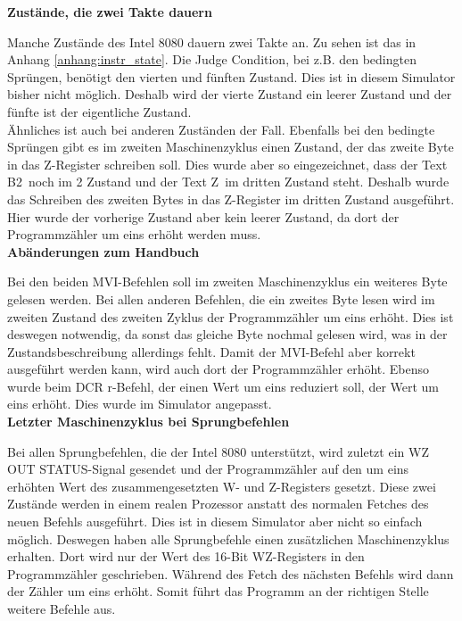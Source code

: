 \documentclass[12pt]{article}
\begin{document}
\noindent
\textbf{Zustände, die zwei Takte dauern}

\noindent
Manche Zustände des Intel 8080 dauern zwei Takte an. Zu sehen ist das in Anhang \ref{anhang:instr_state}. Die Judge Condition, bei z.B. den bedingten Sprüngen, benötigt den vierten und fünften Zustand. Dies ist in diesem Simulator bisher nicht möglich. Deshalb 
wird der vierte Zustand ein leerer Zustand und der fünfte ist der eigentliche Zustand. 
\\

\noindent
Ähnliches ist auch bei anderen Zuständen der Fall. Ebenfalls bei den bedingte Sprüngen gibt es im zweiten Maschinenzyklus einen Zustand, der das zweite Byte in das Z-Register schreiben soll. Dies wurde aber so eingezeichnet, dass der Text \glqq B2\grqq\ noch im 2 Zustand und der Text \glqq Z\grqq\ im dritten Zustand steht. Deshalb wurde das Schreiben des zweiten Bytes in das Z-Register im dritten Zustand ausgeführt. Hier wurde der vorherige Zustand aber kein leerer Zustand, da dort der Programmzähler um eins erhöht werden muss.
\\

\noindent
\textbf{Abänderungen zum Handbuch}

\noindent
Bei den beiden MVI-Befehlen soll im zweiten Maschinenzyklus ein weiteres Byte gelesen werden. Bei allen anderen Befehlen, die ein zweites Byte lesen wird im zweiten Zustand des zweiten Zyklus der Programmzähler um eins erhöht. Dies ist deswegen notwendig, da sonst das gleiche Byte nochmal gelesen wird, was in der Zustandsbeschreibung allerdings fehlt. Damit der MVI-Befehl aber korrekt ausgeführt werden kann, wird auch dort der Programmzähler erhöht. Ebenso wurde beim DCR r-Befehl, der einen Wert um eins reduziert soll, der Wert um eins erhöht. Dies wurde im Simulator angepasst.
\\

\noindent
\textbf{Letzter Maschinenzyklus bei Sprungbefehlen}

\noindent
Bei allen Sprungbefehlen, die der Intel 8080 unterstützt, wird zuletzt ein WZ OUT STATUS-Signal gesendet und der Programmzähler auf den um eins erhöhten Wert des zusammengesetzten W- und Z-Registers gesetzt. Diese zwei Zustände werden in einem realen Prozessor anstatt des normalen Fetches des neuen Befehls ausgeführt. Dies ist in diesem Simulator aber nicht so einfach möglich. Deswegen haben alle Sprungbefehle einen zusätzlichen Maschinenzyklus erhalten. Dort wird nur der Wert des 16-Bit WZ-Registers in den Programmzähler geschrieben. Während des Fetch des nächsten Befehls wird dann der Zähler um eins erhöht. Somit führt das Programm an der richtigen Stelle weitere Befehle aus.
\\
\end{document}
